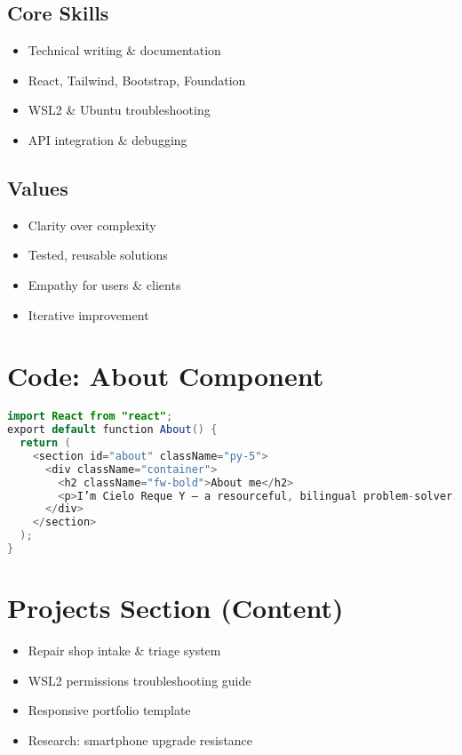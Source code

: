 \documentclass[11pt]{article}
\begin{document}
\subsection*{Core Skills}
\begin{itemize}[leftmargin=*]
    \item Technical writing \& documentation
    \item React, Tailwind, Bootstrap, Foundation
    \item WSL2 \& Ubuntu troubleshooting
    \item API integration \& debugging
\end{itemize}

\subsection*{Values}
\begin{itemize}[leftmargin=*]
    \item Clarity over complexity
    \item Tested, reusable solutions
    \item Empathy for users \& clients
    \item Iterative improvement
\end{itemize}

\section*{Code: About Component}
\begin{lstlisting}[language=Java]
import React from "react";
export default function About() {
  return (
    <section id="about" className="py-5">
      <div className="container">
        <h2 className="fw-bold">About me</h2>
        <p>I’m Cielo Reque Y — a resourceful, bilingual problem-solver...</p>
      </div>
    </section>
  );
}
\end{lstlisting}

\section*{Projects Section (Content)}
\begin{itemize}[leftmargin=*]
  \item Repair shop intake \& triage system
  \item WSL2 permissions troubleshooting guide
  \item Responsive portfolio template
  \item Research: smartphone upgrade resistance
\end{itemize}
\end{document}
